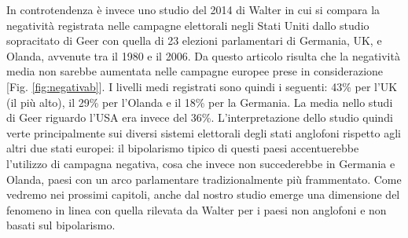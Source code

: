 In controtendenza è invece uno studio del 2014 di Walter \citep{walter2014} in cui si compara la negatività registrata nelle campagne elettorali negli Stati Uniti dallo studio sopracitato di Geer con quella di 23 elezioni parlamentari di Germania, UK, e Olanda, avvenute tra il 1980 e il 2006. Da questo articolo risulta che la negatività media non sarebbe aumentata nelle campagne europee prese in considerazione [Fig. \ref{fig:negativab}]. I livelli medi registrati sono quindi i seguenti: 43\% per l'UK (il più alto), il 29\% per l'Olanda e il 18\% per la Germania. La media nello studi di Geer riguardo l'USA era invece del 36\%.  L’interpretazione dello studio quindi verte principalmente sui diversi sistemi elettorali degli stati anglofoni rispetto agli altri due stati europei: il bipolarismo tipico di questi paesi accentuerebbe l'utilizzo di campagna negativa, cosa che invece non succederebbe in Germania e Olanda, paesi con un arco parlamentare tradizionalmente più frammentato. Come vedremo nei prossimi capitoli, anche dal nostro studio emerge una dimensione del fenomeno in linea con quella rilevata da Walter per i paesi non anglofoni e non basati sul bipolarismo.
